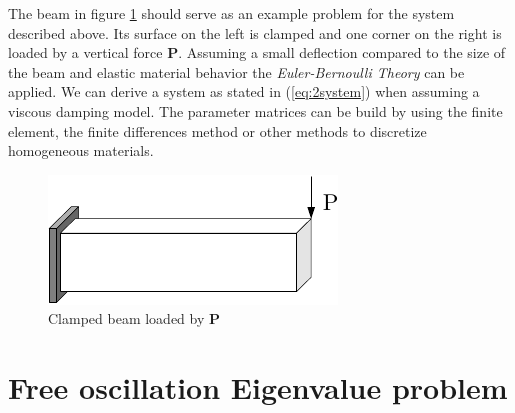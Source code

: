 \documentclass[conference]{journal}
\newcommand{\B}[1]{\mathbf{#1}}
\begin{document}
	The beam in figure \ref{fig:beam} should serve as an example problem for the system described above. Its surface on the left is clamped and one corner on the right is loaded by a vertical force $\B{P}$. Assuming a small deflection compared to the size of the beam and elastic material behavior the \textit{Euler-Bernoulli Theory} can be applied. We can derive a system as stated in (\ref{eq:2system}) when assuming a viscous damping model. The parameter matrices can be build by using the finite element, the finite differences method or other methods to discretize homogeneous materials.

	\begin{figure}[h]
	\centering
	\includegraphics{./figures/beam.pdf}
	\caption{Clamped beam loaded by $\B{P}$}
	\label{fig:beam}
	\end{figure}
	
	\section{Free oscillation Eigenvalue problem}\label{ch:freeOscil}

\end{document}
